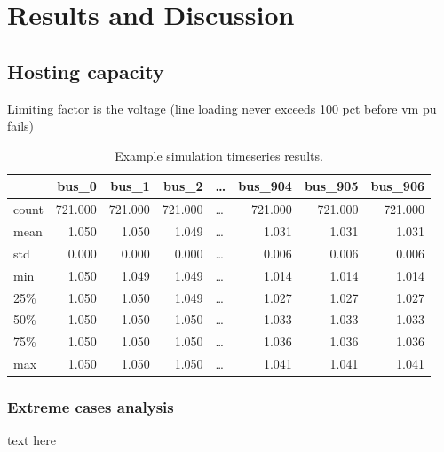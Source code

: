 \documentclass[a4paper,10pt]{report}
\begin{document}
\chapter{Results and Discussion}
\section{Hosting capacity}
Limiting factor is the voltage (line loading never exceeds 100 pct before vm pu fails)
\begin{table}[htpb]
	\centering
	\begin{tabular}{lrrrlrrr}
		\toprule
		& bus\_0 & bus\_1 & bus\_2 & \dots & bus\_904 & bus\_905 & bus\_906 \\
		\midrule
		count & 721.000 & 721.000 & 721.000 & \dots & 721.000 & 721.000 & 721.000 \\
		mean & 1.050 & 1.050 & 1.049 & \dots & 1.031 & 1.031 & 1.031 \\
		std & 0.000 & 0.000 & 0.000 & \dots & 0.006 & 0.006 & 0.006 \\
		min & 1.050 & 1.049 & 1.049 & \dots & 1.014 & 1.014 & 1.014 \\
		25\% & 1.050 & 1.050 & 1.049 & \dots & 1.027 & 1.027 & 1.027 \\
		50\% & 1.050 & 1.050 & 1.050 & \dots & 1.033 & 1.033 & 1.033 \\
		75\% & 1.050 & 1.050 & 1.050 & \dots & 1.036 & 1.036 & 1.036 \\
		max & 1.050 & 1.050 & 1.050 & \dots & 1.041 & 1.041 & 1.041 \\
		\bottomrule
	\end{tabular}
	\caption{Example simulation timeseries results.}
\end{table}

\subsection{Extreme cases analysis}
text here
\end{document}
